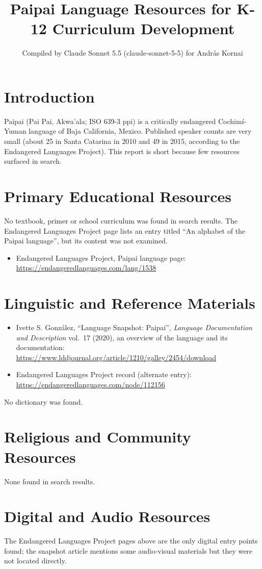 \documentclass[12pt]{article}
\title{Paipai Language Resources for K-12 Curriculum Development}
\author{Compiled by Claude Sonnet 5.5 (claude-sonnet-5-5) for Andr\'as Kornai}
\date{}
\begin{document}
\maketitle

\section{Introduction}
Paipai (Pai Pai, Akwa'ala; ISO 639-3 ppi) is a critically endangered Cochim\'i-Yuman language of Baja California, Mexico. Published speaker counts are very small (about 25 in Santa Catarina in 2010 and 49 in 2015, according to the Endangered Languages Project). This report is short because few resources surfaced in search.

\section{Primary Educational Resources}
No textbook, primer or school curriculum was found in search results. The Endangered Languages Project page lists an entry titled ``An alphabet of the Paipai language'', but its content was not examined.
\begin{itemize}
\item Endangered Languages Project, Paipai language page: \url{https://endangeredlanguages.com/lang/1538}
\end{itemize}

\section{Linguistic and Reference Materials}
\begin{itemize}
\item Ivette S. Gonz\'alez, ``Language Snapshot: Paipai'', \textit{Language Documentation and Description} vol.\ 17 (2020), an overview of the language and its documentation: \url{https://www.lddjournal.org/article/1210/galley/2454/download}
\item Endangered Languages Project record (alternate entry): \url{https://endangeredlanguages.com/node/112156}
\end{itemize}
No dictionary was found.

\section{Religious and Community Resources}
None found in search results.

\section{Digital and Audio Resources}
The Endangered Languages Project pages above are the only digital entry points found; the snapshot article mentions some audio-visual materials but they were not located directly.
\end{document}
